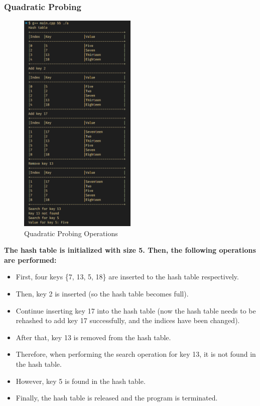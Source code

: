 \subsubsection*{Quadratic Probing}
\begin{figure}[H]
	\centering
	\includegraphics[width=0.5\textwidth, height=0.65\textheight]{images/quadratic_prob/main.png}
	\caption{Quadratic Probing Operations}
\end{figure}
\textbf{The hash table is initialized with size 5. Then, the following operations are performed:}
\begin{itemize}
	\item First, four keys \{7, 13, 5, 18\} are inserted to the hash table respectively.
	\item Then, key 2 is inserted (so the hash table becomes full).
	\item Continue inserting key 17 into the hash table (now the hash table needs to be rehashed to add key 17 successfully, and the indices have been changed).
	\item After that, key 13 is removed from the hash table.
	\item Therefore, when performing the search operation for key 13, it is not found in the hash table.
	\item However, key 5 is found in the hash table.
	\item Finally, the hash table is released and the program is terminated.
\end{itemize}


